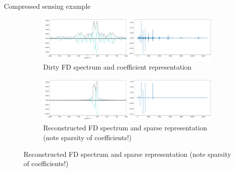 \documentclass[xetex,aspectratio=169]{beamer}
\begin{document}
    \begin{frame}{Compressed sensing example}
        \begin{figure}
            \centering
            \begin{subfigure}{\textwidth}
                \centering
                \includegraphics[width=.9\textwidth]{figures/cs/cs_before.pdf}
                \caption{Dirty FD spectrum and coefficient representation}
            \end{subfigure}
            
            \begin{subfigure}{\textwidth}
                \centering
                \includegraphics[width=.9\textwidth]{figures/cs/cs_after.pdf}
                \caption{Reconstructed FD spectrum and sparse representation (note sparsity of coefficients!)}
            \end{subfigure}
        \end{figure}
    \end{frame}
    
    
\end{document}
